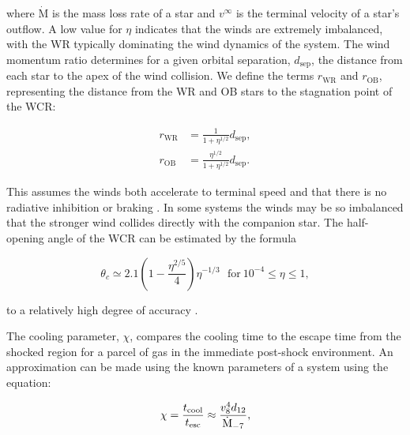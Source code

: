 \noindent
where $\dot{\text{M}}$ is the mass loss rate of a star and $v^\infty$ is the terminal velocity of a star's outflow.
A low value for $\eta$ indicates that the winds are extremely imbalanced, with the WR typically dominating the wind dynamics of the system.
The wind momentum ratio determines for a given orbital separation, $d_\text{sep}$, the distance from each star to the apex of the wind collision.
We define the terms $r_\text{WR}$ and $r_\text{OB}$, representing the distance from the WR and OB stars to the stagnation point of the WCR:

\begin{subequations}
  \begin{align}
    r_\text{WR} & = \frac{1}{1+\eta^{1/2}} d_\text{sep} , \\
    r_\text{OB} & = \frac{\eta^{1/2}}{1+\eta^{1/2}} d_\text{sep} .
  \end{align}
\end{subequations}

\noindent
This assumes the winds both accelerate to terminal speed and that there is no radiative inhibition \parencite{stevens_stagnation-point_1994} or braking \parencite{gayley_sudden_1997}.
In some systems the winds may be so imbalanced that the stronger wind collides directly with the companion star.
The half-opening angle of the WCR can be estimated by the formula

\begin{equation}
  \theta_c \simeq 2.1 \left( 1 - \frac{\eta^{2/5}}{4}\right) \eta^{-1/3} ~~~ \text{for} ~ 10^{-4} \leq \eta \leq 1 ,
\end{equation}

\noindent
to a relatively high degree of accuracy \parencite{eichler_particle_1993,pittardCollidingStellarWinds2018}.

The cooling parameter, $\chi$, compares the cooling time to the escape time from the shocked region for a parcel of gas in the immediate post-shock environment. An approximation can be made using the known parameters of a system using the equation:

\begin{equation}
    \label{eq:paper1-chi}
    \chi = \frac{t_\text{cool}}{t_\text{esc}} \approx \frac{v_8^4 d_{12}}{\dot{\text M}_{-7}} , 
\end{equation}


